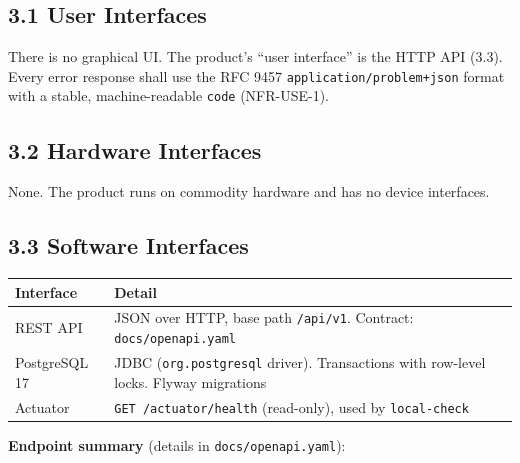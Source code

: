 \documentclass[11pt,a4paper]{article}
\newcounter{none} %
\begin{document}
\subsection{3.1 User Interfaces}\label{user-interfaces}

There is no graphical UI. The product's ``user interface'' is the HTTP API (3.3). Every error
response shall use the RFC 9457 \texttt{application/\allowbreak{}problem+json} format with a stable, machine-readable
\texttt{code} (NFR-USE-1).

\subsection{3.2 Hardware Interfaces}\label{hardware-interfaces}

None. The product runs on commodity hardware and has no device interfaces.

\subsection{3.3 Software Interfaces}\label{software-interfaces}

{\def\LTcaptype{none} %
\begin{longtable}[]{@{}
  >{\raggedright\arraybackslash}p{}
  >{\raggedright\arraybackslash}p{}@{}}
\toprule\noalign{}
\begin{minipage}[b]{\linewidth}\raggedright
Interface
\end{minipage} & \begin{minipage}[b]{\linewidth}\raggedright
Detail
\end{minipage} \\
\midrule\noalign{}
\endhead
\bottomrule\noalign{}
\endlastfoot
REST API & JSON over HTTP, base path \texttt{/\allowbreak{}api/\allowbreak{}v1}. Contract: \texttt{docs/\allowbreak{}openapi.yaml} \\
PostgreSQL 17 & JDBC (\texttt{org.postgresql} driver). Transactions with row-level locks. Flyway migrations \\
Actuator & \texttt{GET\ /\allowbreak{}actuator/\allowbreak{}health} (read-only), used by \texttt{local-check} \\
\end{longtable}
}

\textbf{Endpoint summary} (details in \texttt{docs/\allowbreak{}openapi.yaml}):
\end{document}

